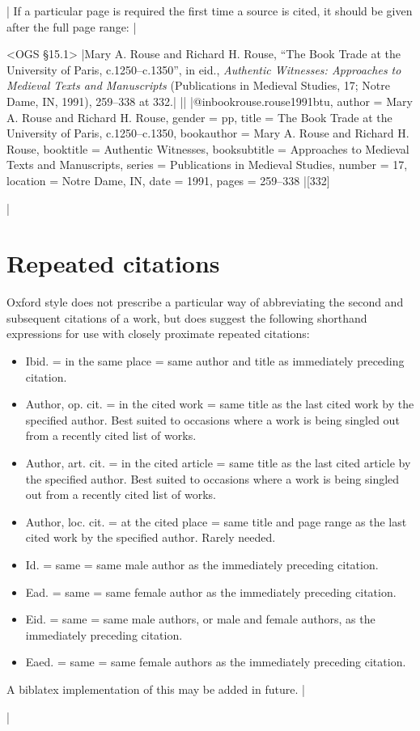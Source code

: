 \documentclass[extrafontsizes,11pt,a4paper,oneside]{memoir}
\begin{document}
\todoc[oxnotes]|
If a particular page is required the first time a source is cited, it should be given after the full page range:
|

\bibexample<OGS \S15.1>
|Mary A. Rouse and Richard H. Rouse, \enquote{The Book Trade at the University of Paris, c.1250--c.1350}, in eid., \emph{Authentic Witnesses: Approaches to Medieval Texts and Manuscripts} (Publications in Medieval Studies, 17; Notre Dame, IN, 1991), 259--338 at 332.|%
||%
|@inbook{rouse.rouse1991btu,
  author = {Mary A. Rouse and Richard H. Rouse},
  gender = {pp},
  title = {The Book Trade at the University of Paris, c.1250--c.1350},
  bookauthor = {Mary A. Rouse and Richard H. Rouse},
  booktitle = {Authentic Witnesses},
  booksubtitle = {Approaches to Medieval Texts and Manuscripts},
  series = {Publications in Medieval Studies},
  number = {17},
  location = {Notre Dame, IN},
  date = {1991},
  pages = {259--338}
}|[332]

\todoc[oxnotes]|
\section{Repeated citations}

Oxford style does not prescribe a particular way of abbreviating the second and subsequent citations of a work, but does suggest the following shorthand expressions for use with closely proximate repeated citations:

\begin{itemize}
  \item Ibid. = in the same place = same author and title as immediately preceding citation.
  \item Author, op. cit. = in the cited work = same title as the last cited work by the specified author. Best suited to occasions where a work is being singled out from a recently cited list of works. 
  \item Author, art. cit. = in the cited article = same title as the last cited article by the specified author. Best suited to occasions where a work is being singled out from a recently cited list of works.
  \item Author, loc. cit. = at the cited place = same title and page range as the last cited work by the specified author. Rarely needed.
  \item Id. = same = same male author as the immediately preceding citation.
  \item Ead. = same = same female author as the immediately preceding citation.
  \item Eid. = same = same male authors, or male and female authors, as the immediately preceding citation.
  \item Eaed. = same = same female authors as the immediately preceding citation.
\end{itemize}

A \textsf{biblatex} implementation of this may be added in future.
|


\todoc|
\end{document}
